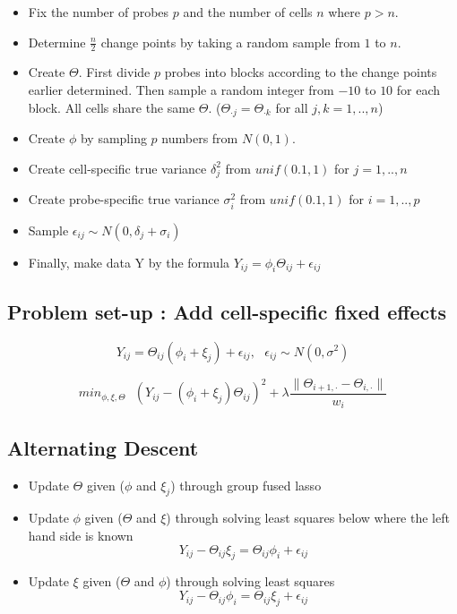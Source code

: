 \documentclass[11pt]{article}
\begin{document}
\begin{itemize}
\item
Fix the number of probes $p$ and the number of cells $n$ where $p > n$.
\item
Determine $\frac{n}{2}$ change points by taking a random sample from $1$ to $n$.
\item
Create $\Theta$. First divide $p$ probes into blocks according to the change points earlier determined. Then sample a random integer from $-10$ to $10$ for each block. All cells share the same $\Theta$. ($\Theta_{\cdot j} = \Theta_{\cdot k}$ for all $j, k = 1, .., n$)
\item
Create $\phi$ by sampling $p$ numbers from $N(0,1)$.
\item
Create cell-specific true variance $\delta_j^2$ from $unif(0.1, 1)$ for $j = 1, .., n$
\item
Create probe-specific true variance $\sigma_i^2$ from $unif(0.1, 1)$ for $i = 1, .., p$
\item
Sample $\epsilon_{ij} \sim N(0, \delta_j + \sigma_i)$
\item
Finally, make data Y by the formula $Y_{ij} = \phi_i \Theta_{ij} + \epsilon_{ij}$
\end{itemize}

\pagebreak

\subsection*{Problem set-up : Add cell-specific fixed effects}

\begin{equation}
Y_{ij} = \Theta_{ij} (\phi_i + \xi_j) + \epsilon_{ij}, \text{  } \epsilon_{ij} \sim N(0, \sigma^2)
\end{equation}

\begin{equation}
min_{\phi, \xi, \Theta} \text{ } \left(Y_{ij}-(\phi_i+\xi_j) \Theta_{ij} \right)^2 + \lambda \frac{\| \Theta_{i+1, \cdot} - \Theta_{i,\cdot}\|}{w_i}
\end{equation}

\subsection*{Alternating Descent}
\begin{itemize}

\item
Update $\Theta$ given ($\phi$ and $\xi_j$) through group fused lasso
\item
Update $\phi$ given ($\Theta$ and $\xi$) through solving least squares below where the left hand side is known
$$Y_{ij} - \Theta_{ij} \xi_j = \Theta_{ij} \phi_i  + \epsilon_{ij}$$
\item
Update $\xi$ given ($\Theta$ and $\phi$) through solving least squares
$$Y_{ij} - \Theta_{ij}\phi_i = \Theta_{ij} \xi_j + \epsilon_{ij}$$

\end{itemize}
\end{document}
